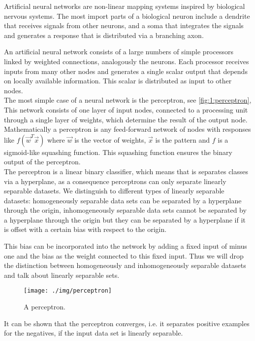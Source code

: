 Artificial neural networks are non-linear mapping systems inspired by biological nervous systems. The most import parts of a biological neuron include a dendrite that receives signals from other neurons, and a soma that integrates the signals and generates a response that is distributed via a branching axon. 

An artificial neural network consists of a large numbers of simple processors linked by weighted connections, analogously the neurons. Each processor receives inputs from many other nodes and generates a single scalar output that depends on locally available information. This scalar is distributed as input to other nodes. \\

The most simple case of a neural network is the perceptron, see \autoref{fig:1:perceptron}, This network consists of one layer of input nodes, connected to a processing unit through a single layer of weights, which determine the result of the output node. Mathematically a perceptron is any feed-forward network of nodes with responses like $f(\vec{w}^T\vec{x})$ where $\vec{w}$ is the vector of weights, $\vec{x}$ is the pattern and $f$ is a sigmoid-like squashing function\cite{reed1998neural}. This squashing function ensures the binary output of the perceptron. \\

The perceptron is a linear binary classifier, which means that is separates classes via a hyperplane, as a consequence perceptrons can only separate linearly separable datasets. We distinguish to different types of linearly separable datasets: homogeneously separable data sets can be separated by a hyperplane through the origin, inhomogeneously separable data sets cannot be separated by a hyperplane through the origin but they can be separated by a hyperplane if it is offset with a certain bias with respect to the origin. 

This bias can be incorporated into the network by adding a fixed input of minus one and the bias as the weight connected to this fixed input. Thus we will drop the distinction between homogeneously and inhomogeneously separable datasets and talk about linearly separable sets. 

\begin{figure}[H]
	\centering
	\texttt{[image: ./img/perceptron]}
	\caption{A perceptron.}
	\label{fig:1:perceptron}
\end{figure}

It can be shown that the perceptron converges, i.e. it separates positive examples for the negatives, if the input data set is linearly separable. 



